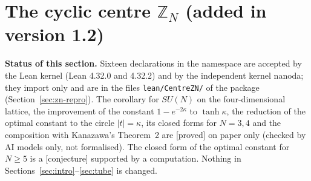 \documentclass[11pt,a4paper]{article}
\theoremstyle{plain}
\theoremstyle{definition}
\theoremstyle{remark}
\numberwithin{equation}{section}
\newcommand{\lean}[1]{\texttt{\expandafter\leanbk\detokenize{#1}\relax}}
\def\leanbk#1{\ifx#1\relax\else\ifx#1.#1\allowbreak\else\ifx#1_#1\allowbreak\else#1\fi\fi\expandafter\leanbk\fi}
\newcommand{\st}[1]{\textsf{[#1]}}
\begin{document}
\section{The cyclic centre $\mathbb Z_N$ (added in version 1.2)}\label{sec:zn}
\textbf{Status of this section.} Sixteen declarations in the namespace \lean{CentreZN} are accepted by the Lean kernel (Lean 4.32.0 and 4.32.2) and by the independent kernel nanoda; they import \lean{Mathlib} only and are in the files \texttt{lean/CentreZN/} of the package (Section~\ref{sec:zn-repro}). The corollary for $SU(N)$ on the four-dimensional lattice, the improvement of the constant $1-e^{-2\kappa}$ to $\tanh\kappa$, the reduction of the optimal constant to the circle $|t|=\kappa$, its closed forms for $N=3,4$ and the composition with Kanazawa's Theorem~2 are \st{proved} on paper only (checked by AI models only, not formalised). The closed form of the optimal constant for $N\ge5$ is a \st{conjecture} supported by a computation. Nothing in Sections~\ref{sec:intro}--\ref{sec:tube} is changed.
\end{document}
